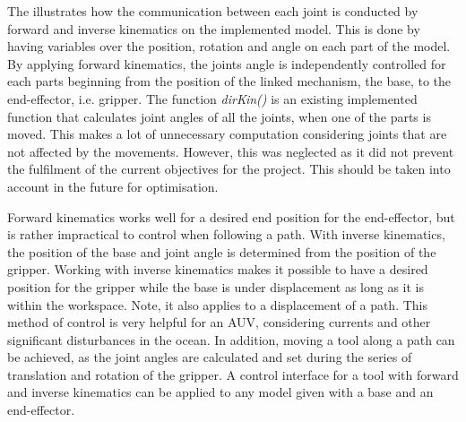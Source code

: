 The  illustrates how the communication between each joint is conducted by forward and inverse kinematics on the implemented model. This is done by having variables over the position, rotation and angle on each part of the model. By applying forward kinematics, the joints angle is independently controlled for each parts beginning from the position of the linked mechanism, the base, to the end-effector, i.e. gripper. The function \textit{dirKin()} is an existing implemented function that calculates joint angles of all the joints, when one of the parts is moved. This makes a lot of unnecessary computation considering joints that are not affected by the movements. However, this was neglected as it did not prevent the fulfilment of the current objectives for the project. This should be taken into account in the future for optimisation. 

Forward kinematics works well for a desired end position for the end-effector, but is rather impractical to control when following a path. With inverse kinematics, the position of the base and joint angle is determined from the position of the gripper. Working with inverse kinematics makes it possible to have a desired position for the gripper while the base is under displacement as long as it is within the workspace. Note, it also applies to a displacement of a path. This method of control is very helpful for an AUV, considering currents and other significant disturbances in the ocean. In addition, moving a tool along a path can be achieved, as the joint angles are calculated and set during the series of translation and rotation of the gripper. A control interface for a tool with forward and inverse kinematics can be applied to any model given with a base and an end-effector. 

